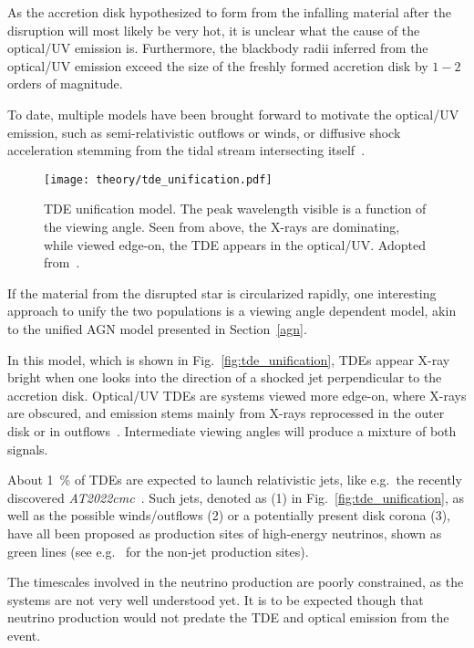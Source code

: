 As the accretion disk hypothesized  to form from the infalling material after the disruption will most likely be very hot, it is unclear what the cause of the optical/UV emission is. Furthermore, the blackbody radii inferred from the optical/UV emission exceed the size of the freshly formed accretion disk by $1-2$ orders of magnitude.

To date, multiple models have been brought forward to motivate the optical/UV emission, such as semi-relativistic outflows or winds, or diffusive shock acceleration stemming from the tidal stream intersecting itself~\cite{Gezari2021}.

\begin{figure}[htbp]
    \texttt{[image: theory/tde\_unification.pdf]}
    \caption[TDE Unification]{TDE unification model. The peak wavelength visible is a function of the viewing angle. Seen from above, the X-rays are dominating, while viewed edge-on, the TDE appears in the optical/UV\@. Adopted from~\cite{Hayasaki2021}.}
\end{figure}

If the material from the disrupted star is circularized rapidly, one interesting approach to unify the two populations is a viewing angle dependent model, akin to the unified AGN model presented in Section~\ref{agn}.

In this model, which is shown in Fig.~\ref{fig:tde_unification}, TDEs appear X-ray bright when one looks into the direction of a shocked jet perpendicular to the accretion disk. Optical/UV TDEs are systems viewed more edge-on, where X-rays are obscured, and emission stems mainly from X-rays reprocessed in the outer disk or in outflows~. Intermediate viewing angles will produce a mixture of both signals.

About \SI{1}{\percent} of TDEs are expected to launch relativistic jets, like e.g.\ the recently discovered \textit{AT2022cmc}~. Such jets, denoted as (1) in Fig.~\ref{fig:tde_unification}, as well as the possible winds/outflows (2) or a potentially present disk corona (3), have all been proposed as production sites of high-energy neutrinos, shown as green lines (see e.g.~ for the non-jet production sites).

The timescales involved in the neutrino production are poorly constrained, as the systems are not very well understood yet. It is to be expected though that neutrino production would not predate the TDE and optical emission from the event.

